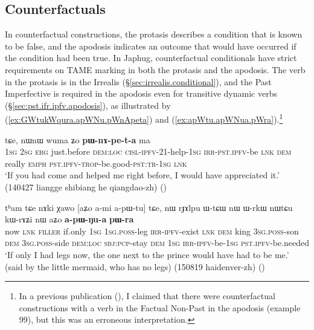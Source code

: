  \subsection{Counterfactuals} \label{sec:counterfactual}
In counterfactual constructions, the protasis describes a condition that is known to be false, and the apodosis indicates an outcome that would have occurred if the condition had been true. In Japhug, counterfactual conditionals have strict requirements on TAME marking in both the protasis and the apodosis. The verb in the protasis is in the  Irrealis (§\ref{sec:irrealis.conditional}), and the Past Imperfective is required in the apodosis even for transitive dynamic verbs (§\ref{sec:pst.ifr.ipfv.apodosis}), as illustrated by (\ref{ex:GWtukWqura.apWNu.pWnApeta}) and (\ref{ex:apWtu.apWNua.pWra}).\footnote{In a previous publication (\citealt[301]{jacques14linking}), I claimed that there were counterfactual constructions with a verb in the Factual Non-Past in the apodosis (example 99), but this was an erroneous interpretation.  }
 
 \begin{exe}
\ex \label{ex:GWtukWqura.apWNu.pWnApeta}
 tɕe, nɯnɯ wuma ʑo \textbf{pɯ-nɤ-pe-t-a} ma \\
\textsc{1sg} \textsc{2sg} \textsc{erg} just.before \textsc{dem}:\textsc{loc} \textsc{cisl}-\textsc{ipfv}-2\fl{}1-help-\textsc{1sg} \textsc{irr}-\textsc{pst}.\textsc{ipfv}-be \textsc{lnk} \textsc{dem} really \textsc{emph} \textsc{pst}.\textsc{ipfv}-\textsc{trop}-be.good-\textsc{pst}:\textsc{tr}-\textsc{1sg} \textsc{lnk} \\
\glt `If you had come and helped me right before, I would have appreciated it.' (140427 liangge shibiang he qiangdao-zh)
()
\end{exe}
 
\begin{exe}
\ex \label{ex:apWtu.apWNua.pWra}
\gll tʰam tɕe nɤki χawo [aʑo a-mi a-pɯ-tu] tɕe, nɯ rɟɤlpu ɯ-tɕɯ nɯ ɯ-rkɯ nɯtɕu kɯ-rɤʑi nɯ aʑo \textbf{a-pɯ-ŋu-a} \textbf{pɯ-ra} \\
now \textsc{lnk} \textsc{filler} if.only \textsc{1sg} \textsc{1sg}.\textsc{poss}-leg \textsc{irr}-\textsc{ipfv}-exist \textsc{lnk} \textsc{dem} king \textsc{3sg}.\textsc{poss}-son \textsc{dem} \textsc{3sg}.\textsc{poss}-side \textsc{dem}:\textsc{loc} \textsc{sbj}:\textsc{pcp}-stay \textsc{dem} \textsc{1sg} \textsc{irr}-\textsc{ipfv}-be-\textsc{1sg} \textsc{pst}.\textsc{ipfv}-be.needed \\
\glt `If only I had legs now, the one next to the prince would have had to be me.' (said by the little mermaid, who has no legs) (150819 haidenver-zh)
()
\end{exe}

